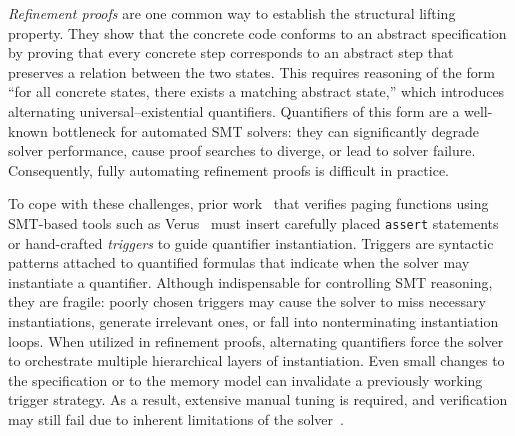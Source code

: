 \documentclass[sigplan,nonacm,10pt]{acmart}
\begin{document}
\emph{Refinement proofs} are one common way to establish the structural lifting property. They show that the concrete code conforms to an abstract specification by proving that every concrete step corresponds to an abstract step that preserves a relation between the two states. This requires reasoning of the form “for all concrete states, there exists a matching abstract state,” which introduces alternating universal–existential quantifiers. Quantifiers of this form are a well-known bottleneck for automated SMT solvers: they can significantly degrade solver performance, cause proof searches to diverge, or lead to solver failure. Consequently, fully automating refinement proofs is difficult in practice.

To cope with these challenges, prior work~\cite{brun23hotos,atmosphere2025sosp,Brun2022VerifiedPaging} that verifies paging functions using SMT-based tools such as Verus~\cite{verus} must insert carefully placed \texttt{assert} statements or hand-crafted \emph{triggers} to guide quantifier instantiation. Triggers are syntactic patterns attached to quantified formulas that indicate when the solver may instantiate a quantifier. Although indispensable for controlling SMT reasoning, they are fragile: poorly chosen triggers may cause the solver to miss necessary instantiations, generate irrelevant ones, or fall into nonterminating instantiation loops. When utilized in refinement proofs, alternating quantifiers force the solver to orchestrate multiple hierarchical layers of instantiation. Even small changes to the specification or to the memory model can invalidate a previously working trigger strategy. As a result, extensive manual tuning is required, and verification may still fail due to inherent limitations of the solver~\cite {Brun2022VerifiedPaging}.
\end{document}
